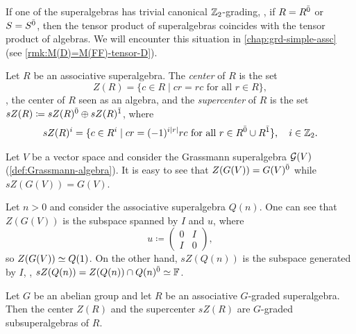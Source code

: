 If one of the superalgebras has trivial canonical $\mathbb{Z}_2$-grading, \ie, if $R = R^{\bar0}$ or $S = S^{\bar0}$, then the tensor product of superalgebras coincides with the tensor product of algebras. 
We will encounter this situation in \cref{chap:grd-simple-assc} (see \cref{rmk:M(D)=M(FF)-tensor-D}). 



\begin{defi}\label{defi:center}
	Let $R$ be an associative superalgebra.
	The \emph{center} of $R$ is the set
	\[
		Z(R) = \{c\in R \mid cr = rc \text{ for all } r\in R \},
	\]
	\ie, the center of $R$ seen as an algebra, and the \emph{supercenter} of $R$ is the set $sZ(R) \coloneqq sZ(R)^{\bar0} \oplus sZ(R)^{\bar1}$, where
	\begin{align*}
		sZ(R)^i = \{c\in R^i \mid cr = (-1)^{i |r|} rc \text{ for all } r\in R^{\bar0}\cup R^{\bar1} \},\quad i \in \mathbb{Z}_2.
	\end{align*}
\end{defi}

\begin{ex}
    Let $V$ be a vector space and consider the Grassmann superalgebra $\mathcal G (V)$ (\cref{def:Grassmann-algebra}). 
    It is easy to see that $Z(G (V)) = G (V)^{\bar0}$ while $sZ(G (V)) = G (V)$. 
\end{ex}

\begin{ex}
    Let $n > 0$ and consider the associative superalgebra $Q(n)$. 
    One can see that $Z(G (V))$ is the subspace spanned by $I$ and $u$, where
    \[
        u \coloneqq
        \left(\begin{array}{c|c}
            0 & I\\
            \hline
            I & 0
        \end{array}\right),
    \]
    so $Z(G (V)) \simeq Q(1)$. 
    On the other hand, $sZ(Q(n))$ is the subspace generated by $I$, \ie, $sZ(Q(n)) = Z(Q(n)) \cap Q(n)^{\bar0} \simeq \mathbb{F}$.
\end{ex}

\begin{lemma}\label{lemma:center-is-graded}
	Let $G$ be an abelian group and let $R$ be an associative $G$-graded superalgebra.
	Then the center $Z(R)$ and the supercenter $sZ(R)$ are $G$-graded subsuperalgebras of $R$.
\end{lemma}

